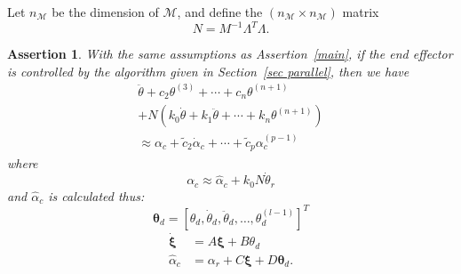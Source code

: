 \documentclass[reqno,twocolumn]{amsart}
\newtheorem{assertion}{Assertion}
\renewcommand{\mathsf}{}
\begin{document}
Let $n_{\mathcal M}$ be the dimension of $\mathcal M$, and define the $(n_{\mathcal M} \times n_{\mathcal M})$ matrix
\begin{equation}
\mathsf N = \mathsf M^{-1} \mathsf\Lambda^T \mathsf\Lambda.
\end{equation}

\begin{assertion}
\label{pre main}
With the same assumptions as Assertion~\ref{main}, if the end effector is controlled by the algorithm given in Section~\ref{sec parallel}, then we have
\begin{multline}
\label{system passive load alpha}
\ddot\theta + c_2 \theta^{(3)} + \cdots + c_n \theta^{(n+1)} \\
+ \mathsf N (k_0 \dot\theta + k_1 \ddot\theta + \cdots + k_n \theta^{(n+1)}) \\
\approx \alpha_c  + \tilde c_2 \dot \alpha_c + \cdots + \tilde c_p \alpha_c^{(p-1)}
\end{multline}
where
\begin{equation}
\alpha_c \approx \hat\alpha_c + k_0 \mathsf N \dot\theta_r
\end{equation}
and $\hat\alpha_c$ is calculated thus:
\begin{equation}
\bm \theta_d = [\theta_d, \dot \theta_d, \ddot \theta_d, \dots, \theta_d^{(l-1)}]^T
\end{equation}
\begin{align}
\dot {\bm \xi} &= \mathsf A \bm \xi + \mathsf B \theta_d \\
\hat\alpha_c &= \alpha_r + \mathsf C \bm \xi + \mathsf D \bm \theta_d.
\end{align}
\end{assertion}
\end{document}
